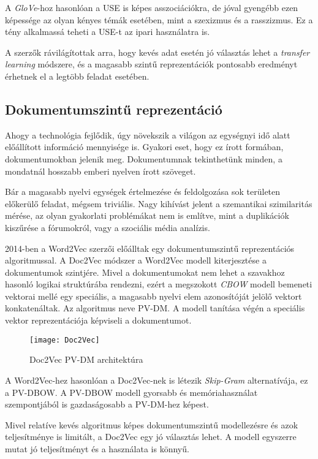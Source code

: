 A \textit{GloVe}-hoz hasonlóan a USE is képes asszociációkra, de jóval gyengébb ezen képessége az olyan kényes témák esetében, mint a szexizmus és a rasszizmus. Ez a tény alkalmassá teheti a USE-t az ipari használatra is.

A szerzők rávilágítottak arra, hogy kevés adat esetén jó választás lehet a \textit{transfer learning} módszere, és a magasabb szintű reprezentációk pontosabb eredményt érhetnek el a legtöbb feladat esetében.

\subsection{Dokumentumszintű reprezentáció}
Ahogy a technológia fejlődik, úgy növekszik a világon az egységnyi idő alatt előállított információ mennyisége is. Gyakori eset, hogy ez írott formában, dokumentumokban jelenik meg. Dokumentumnak tekinthetünk minden, a mondatnál hosszabb emberi nyelven írott szöveget.

Bár a magasabb nyelvi egységek értelmezése és feldolgozása sok területen előkerülő feladat, mégsem triviális. Nagy kihívást jelent a szemantikai szimilaritás mérése, az olyan gyakorlati problémákat nem is említve, mint a duplikációk kiszűrése a fórumokról, vagy a szociális média analízis.

2014-ben a Word2Vec szerzői előálltak egy dokumentumszintű reprezentációs algoritmussal. A Doc2Vec módszer a Word2Vec modell kiterjesztése a dokumentumok szintjére. Mivel a dokumentumokat nem lehet a szavakhoz hasonló logikai struktúrába rendezni, ezért a megszokott \textit{CBOW} modell bemeneti vektorai mellé egy speciális, a magasabb nyelvi elem azonosítóját jelölő vektort konkatenáltak. Az algoritmus neve PV-DM. A modell tanítása végén a speciális vektor reprezentációja képviseli a dokumentumot.

\begin{figure}[H]
	\centering
	\texttt{[image: Doc2Vec]}
	\caption{Doc2Vec PV-DM architektúra}
\end{figure}

A Word2Vec-hez hasonlóan a Doc2Vec-nek is létezik \textit{Skip-Gram} alternatívája, ez a PV-DBOW. A PV-DBOW modell gyorsabb és memóriahasználat szempontjából is gazdaságosabb a PV-DM-hez képest.

Mivel relatíve kevés algoritmus képes dokumentumszintű modellezésre és azok teljesítménye is limitált, a Doc2Vec egy jó választás lehet. A modell egyszerre mutat jó teljesítményt és a használata is könnyű.


